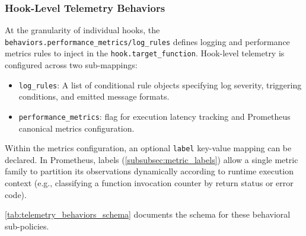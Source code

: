 \subsubsection{Hook-Level Telemetry Behaviors}

At the granularity of individual hooks, the \texttt{behaviors.performance\_metrics/log\_rules} defines logging and performance metrics rules to inject in the \texttt{hook.target\_function}.
Hook-level telemetry is configured across two sub-mappings:
\begin{itemize}
	\item \texttt{log\_rules}: A list of conditional rule objects specifying log severity, triggering conditions, and emitted message formats.
	\item \texttt{performance\_metrics}: flag for execution latency tracking and Prometheus canonical metrics configuration.
\end{itemize}

Within the metrics configuration, an optional \texttt{label} key-value mapping can be declared.
In Prometheus, labels (\cref{subsubsec:metric_labels}) allow a single metric family to partition its observations dynamically according to runtime execution context (e.g., classifying a function invocation counter by return status or error code).

\cref{tab:telemetry_behaviors_schema} documents the schema for these behavioral sub-policies.

